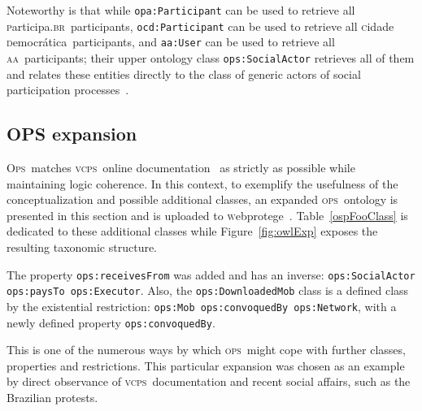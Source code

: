 \documentclass[10pt,letterpaper]{article}
\newcommand{\ops}{\textsc{ops}}
\newcommand{\opsi}{O\textsc{ps}}
\newcommand{\vcps}{\textsc{vcps}}
\newcommand{\aan}{\textsc{aa}}
\newcommand{\cidadedemocratica}{\textsc{c}idade \textsc{d}emocr\'atica}
\newcommand{\participa}{\textsc{p}articipa.\textsc{br}}
\newcommand{\webprotege}{\textsc{w}ebprotege}
\begin{document}
Noteworthy is that while {\tt opa:Participant} can be used to retrieve all \participa\ participants,
{\tt ocd:Participant} can be used to retrieve all \cidadedemocratica\ participants,
and {\tt aa:User} can be used to retrieve all \aan\ participants;
their upper ontology class {\tt ops:SocialActor} retrieves all of them
and relates these entities directly to the class of generic actors of social participation processes~\cite{pnud5}.

\subsection{OPS expansion}\label{downwards}
\opsi\ matches \vcps\ online documentation~\cite{corais} as strictly as possible while maintaining logic coherence.
In this context, to exemplify the usefulness of the conceptualization
and possible additional classes,
an expanded \ops\ ontology is presented in this section 
and is uploaded to \webprotege~\cite{owlExp}.
Table~\ref{ospFooClass} is dedicated to these additional classes
while Figure~\ref{fig:owlExp} exposes the resulting taxonomic structure.

The property {\tt ops:receivesFrom} was added and has an inverse:
\texttt{ops:SocialActor ops:paysTo ops:Executor}.
Also, the {\tt ops:DownloadedMob} class is a defined class by the existential restriction:
\texttt{ops:Mob ops:convoquedBy ops:Network}, with a newly defined property \texttt{ops:convoquedBy}.

This is one of the numerous ways by which \ops\ might cope with further classes,
properties and restrictions.
This particular expansion was chosen as an example by direct observance of
\vcps\ documentation and recent social affairs, such as the Brazilian protests.
\end{document}
